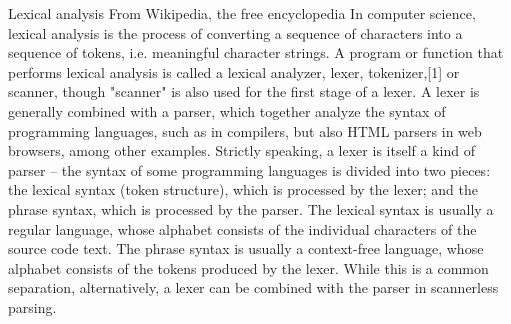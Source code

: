 Lexical analysis
From Wikipedia, the free encyclopedia
In computer science, lexical analysis is the process of converting a sequence of characters into a sequence of tokens, i.e. meaningful character strings. A program or function that performs lexical analysis is called a lexical analyzer, lexer, tokenizer,[1] or scanner, though "scanner" is also used for the first stage of a lexer. A lexer is generally combined with a parser, which together analyze the syntax of programming languages, such as in compilers, but also HTML parsers in web browsers, among other examples.
Strictly speaking, a lexer is itself a kind of parser – the syntax of some programming languages is divided into two pieces: the lexical syntax (token structure), which is processed by the lexer; and the phrase syntax, which is processed by the parser. The lexical syntax is usually a regular language, whose alphabet consists of the individual characters of the source code text. The phrase syntax is usually a context-free language, whose alphabet consists of the tokens produced by the lexer. While this is a common separation, alternatively, a lexer can be combined with the parser in scannerless parsing.
